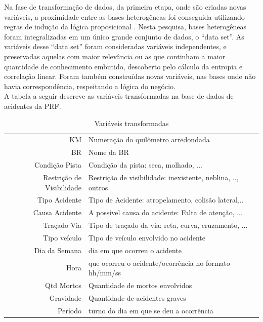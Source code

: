 Na fase de transformação de dados, da primeira etapa, onde são criadas novas variáveis, a proximidade entre as
bases heterogêneas foi conseguida utilizando regras de indução da lógica proposicional \cite{NorvigRussel2004}.
Nesta pesquisa, bases heterogêneas foram integralizadas em um único grande conjunto de dados, o ``data set''. As variáveis desse ``data set'' foram consideradas variáveis independentes, e preservadas aquelas com maior relevância ou as que continham a maior quantidade de conhecimento embutido, descoberto pelo cálculo da entropia e correlação linear. Foram também construídas novas variáveis, nas bases onde não havia correspondência, respeitando a lógica do negócio.\\
A tabela a seguir descreve as variáveis transformadas na base de dados de acidentes da PRF.

\begin{table}[htbp!]
	\centering
	\caption{Variáveis transformadas} 
	\begin{tabular}{r|l} \hline
		KM & Numeração do quilômetro arredondada \\
		BR & Nome da BR \\
		Condição Pista & Condição da pista: seca, molhado, ... \\
		Restrição de Visibilidade & Restrição de visibilidade: inexistente, neblina, .., outros \\
		Tipo Acidente & Tipo de Acidente: atropelamento, colisão lateral,..\\
		Causa Acidente & A possível causa do acidente: Falta de atenção, ... \\
		Traçado Via & Tipo de traçado da via: reta, curva, cruzamento, ... \\
		Tipo veículo & Tipo de veículo envolvido no acidente \\
		Dia da Semana & dia em que ocorreu o acidente\\
		Hora & que ocorreu o acidente/ocorrência no formato hh/mm/ss \\
		Qtd Mortos & Quantidade de mortos envolvidos \\
		Gravidade & Quantidade de acidentes graves \\
		Período & turno do dia em que se deu a ocorrência \\
	\end{tabular}
\end{table}
 
\vspace{7mm}

\pagebreak

